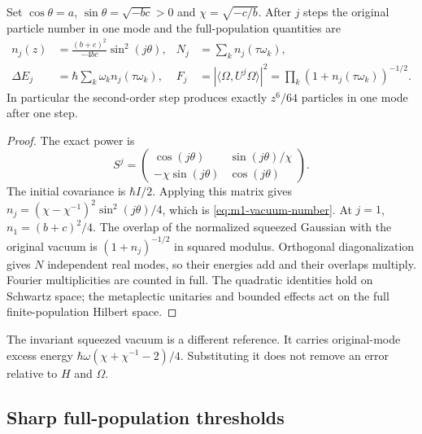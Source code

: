 \begin{proposition}
\label{prop:m1-vacuum-excitation}
Set $\cos\theta=a$, $\sin\theta=\sqrt{-bc}>0$ and
$\chi=\sqrt{-c/b}$. After $j$ steps the original particle number in one
mode and the full-population quantities are
\begin{align}
 n_j(z)&=\frac{(b+c)^2}{-4bc}\sin^2(j\theta),
 &N_j&=\sum_k n_j(\tau\omega_k),\label{eq:m1-vacuum-number}\\
 \Delta E_j&=\hbar\sum_k\omega_k n_j(\tau\omega_k),
 &F_j&=|\langle\Omega,U^j\Omega\rangle|^2
       =\prod_k(1+n_j(\tau\omega_k))^{-1/2}.
\end{align}
In particular the second-order step produces exactly $z^6/64$ particles
in one mode after one step.
\end{proposition}
\begin{proof}
The exact power is
\[
 S^j=\begin{pmatrix}
 \cos(j\theta)&\sin(j\theta)/\chi\\
 -\chi\sin(j\theta)&\cos(j\theta)
 \end{pmatrix}.
\]
The initial covariance is $\hbar I/2$. Applying this matrix gives
$n_j=(\chi-\chi^{-1})^2\sin^2(j\theta)/4$, which is
\eqref{eq:m1-vacuum-number}. At $j=1$, $n_1=(b+c)^2/4$.
The overlap of the normalized squeezed Gaussian with the original vacuum
is $(1+n_j)^{-1/2}$ in squared modulus. Orthogonal diagonalization gives
$N$ independent real modes, so their energies add and their overlaps
multiply. Fourier multiplicities are counted in full. The quadratic
identities hold on Schwartz space; the metaplectic unitaries and bounded
effects act on the full finite-population Hilbert space.
\end{proof}

The invariant squeezed vacuum is a different reference. It carries
original-mode excess energy
$\hbar\omega(\chi+\chi^{-1}-2)/4$. Substituting it does not remove an
error relative to $H$ and $\Omega$.

\subsection{Sharp full-population thresholds}

